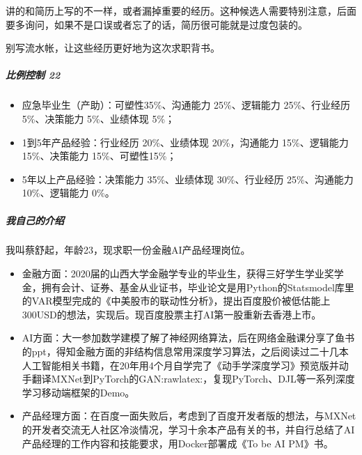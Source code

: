 \documentclass[letterpaper,11pt,english]{sphinxmanual}
\begin{document}
讲的和简历上写的不一样，或者漏掉重要的经历。这种候选人需要特别注意，后面要多询问，如果不是口误或者忘了的话，简历很可能就是过度包装的。

别写流水帐，让这些经历更好地为这次求职背书。%
\begin{footnote}[792]\sphinxAtStartFootnote
{}
%
\end{footnote}


\subparagraph{比例控制 22\sphinxfootnotemark[793]}
\label{\detokenize{chapter_interview/question:id5}}%
\begin{footnotetext}[793]\sphinxAtStartFootnote
{}
%
\end{footnotetext}\ignorespaces \begin{itemize}
\item {} 
应急毕业生（产助）：可塑性35\%、沟通能力 25\%、逻辑能力 25\%、行业经历
5\%、决策能力 5\%、业绩体现 5\%；

\item {} 
1到5年产品经验：行业经历 20\%、业绩体现 20\%，沟通能力
15\%、逻辑能力15\%、决策能力 15\%、可塑性15\%；

\item {} 
5年以上产品经验：决策能力 35\%、业绩体现 30\%、行业经历 25\%、沟通能力
10\%、逻辑能力 0\%。

\end{itemize}


\subparagraph{我自己的介绍}
\label{\detokenize{chapter_interview/question:id6}}
我叫蔡舒起，年龄23，现求职一份金融AI产品经理岗位。
\begin{itemize}
\item {} 
金融方面：2020届的山西大学金融学专业的毕业生，获得三好学生学业奖学金，拥有会计、证券、基金从业证书，毕业论文是用Python的Statsmodel库里的VAR模型完成的《中美股市的联动性分析》，提出百度股价被低估能上300USD的想法，实现后。现百度股票主打AI第一股重新去香港上市。

\item {} 
AI方面：大一参加数学建模了解了神经网络算法，后在网络金融课分享了鱼书的ppt，得知金融方面的非结构信息常用深度学习算法，之后阅读过二十几本人工智能相关书籍，在20年用4个月自学完了《动手学深度学习》预览版并动手翻译MXNet到PyTorch的GAN:raw\sphinxhyphen{}latex:，复现PyTorch、DJL等一系列深度学习移动端框架的Demo。

\item {} 
产品经理方面：在百度一面失败后，考虑到了百度开发者版的想法，与MXNet的开发者交流无人社区冷淡情况，学习十余本产品有关的书，并自行总结了AI产品经理的工作内容和技能要求，用Docker部署成《To
be AI PM》书。

\end{itemize}
\end{document}
